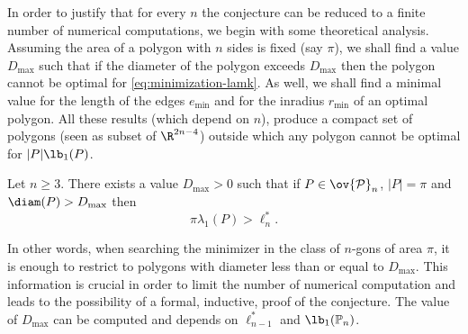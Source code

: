 In order to justify that for every $n$ the conjecture can be reduced to a finite number of numerical computations, we begin with some theoretical analysis. Assuming the area of a polygon with $n$ sides is fixed (say $\pi$), we shall find a value $D_{\max}$ such that if the diameter of the polygon exceeds $D_{\max}$ then the polygon cannot be optimal for \eqref{eq:minimization-lamk}. As well, we shall find a minimal value for the length of the edges $e_{\min}$ and for the inradius $r_{\min}$ of an optimal polygon. All these results (which depend on $n$), produce a compact set of polygons (seen as subset of $\R^{2n-4}$) outside which any polygon cannot be optimal for $|P|\lb_1(P)$.

\begin{thm}\label{bobu47}
Let $n\ge 3$. There exists a value $D_{\max} >0$ such that if $P \in \ov {\mathcal P}_n$, $|P|=\pi$ and $\diam (P) > D_{\max}$ then
\[
\pi \lambda_1(P) > \ell_{n}^*.
\]
\end{thm}
In other words, when searching the minimizer in the class of $n$-gons of area $\pi$, it is enough to restrict to polygons with diameter less than or equal to $D_{\max}$. This information is crucial in order to limit the number of numerical computation and leads to the possibility of a formal, inductive, proof of the conjecture. The value of $D_{\max}$ can be computed and depends on $\ell^*_{n-1}$ and $\lb_1(\mathbb P_n)$.

